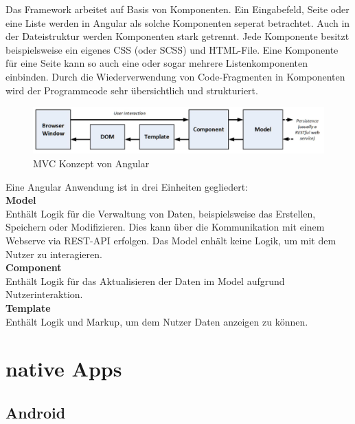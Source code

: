Das Framework arbeitet auf Basis von Komponenten. Ein Eingabefeld, Seite oder eine Liste werden in Angular als solche Komponenten seperat betrachtet. Auch in der Dateistruktur werden Komponenten stark getrennt. Jede Komponente besitzt beispielsweise ein eigenes CSS (oder SCSS) und HTML-File. Eine Komponente für eine Seite kann so auch eine oder sogar mehrere Listenkomponenten einbinden. Durch die Wiederverwendung von Code-Fragmenten in Komponenten wird der Programmcode sehr übersichtlich und strukturiert.

\begin{figure}[h]
        \includegraphics[width=\linewidth]{img/Angular_MVC.JPG}
        \centering
        \caption{MVC Konzept von Angular \cite[S. 35, Abbildung 3-4]{ProAngular}}
        \label{fig:angularmvc}
\end{figure}

Eine Angular Anwendung ist in drei Einheiten gegliedert:\\

\textbf{Model}\\ 
Enthält Logik für die Verwaltung von Daten, beispielsweise das Erstellen, Speichern oder Modifizieren. Dies kann über die Kommunikation mit einem Webserve via REST-API erfolgen. Das Model enhält keine Logik, um mit dem Nutzer zu interagieren.\\

\textbf{Component}\\
Enthält Logik für das Aktualisieren der Daten im Model aufgrund Nutzerinteraktion. \\

\textbf{Template}\\ 
Enthält Logik und Markup, um dem Nutzer Daten anzeigen zu können.

\cite{ProAngular}

\section{native Apps}



\subsection{Android}

